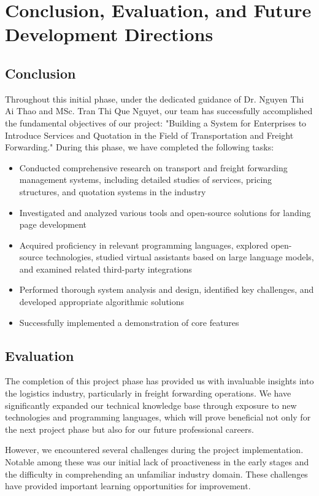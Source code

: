 \chapter{Conclusion, Evaluation, and Future Development Directions}
\section{Conclusion}
Throughout this initial phase, under the dedicated guidance of Dr. Nguyen Thi Ai Thao and MSc. Tran Thi Que Nguyet, our team has successfully accomplished the fundamental objectives of our project: "Building a System for Enterprises to Introduce Services and Quotation in the Field of Transportation and Freight Forwarding." During this phase, we have completed the following tasks:
\begin{itemize}
    \item Conducted comprehensive research on transport and freight forwarding management systems, including detailed studies of services, pricing structures, and quotation systems in the industry
    \item Investigated and analyzed various tools and open-source solutions for landing page development
    \item Acquired proficiency in relevant programming languages, explored open-source technologies, studied virtual assistants based on large language models, and examined related third-party integrations
    \item Performed thorough system analysis and design, identified key challenges, and developed appropriate algorithmic solutions
    \item Successfully implemented a demonstration of core features
\end{itemize}
\section{Evaluation}
The completion of this project phase has provided us with invaluable insights into the logistics industry, particularly in freight forwarding operations. We have significantly expanded our technical knowledge base through exposure to new technologies and programming languages, which will prove beneficial not only for the next project phase but also for our future professional careers.

However, we encountered several challenges during the project implementation. Notable among these was our initial lack of proactiveness in the early stages and the difficulty in comprehending an unfamiliar industry domain. These challenges have provided important learning opportunities for improvement.

